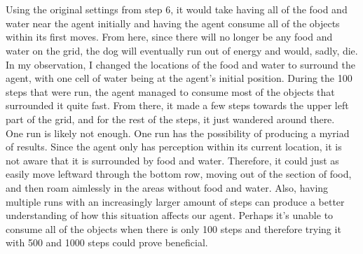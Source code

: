 \documentclass{article}
\begin{document}
    \section{}
        \begin{figure}[hbp]%
            \centering
            \hspace{1in}%
        \end{figure}
        Using the original settings from step 6, it would take having all of the food and water near the agent initially and having the agent consume all of the objects within its first moves. From here, since there will no longer be any food and water on the grid, the dog will eventually run out of energy and would, sadly, die.\\

        In my observation, I changed the locations of the food and water to surround the agent, with one cell of water being at the agent's initial position. During the 100 steps that were run, the agent managed to consume most of the objects that surrounded it quite fast. From there, it made a few steps towards the upper left part of the grid, and for the rest of the steps, it just wandered around there.\\

        One run is likely not enough. One run has the possibility of producing a myriad of results. Since the agent only has perception within its current location, it is not aware that it is surrounded by food and water. Therefore, it could just as easily move leftward through the bottom row, moving out of the section of food, and then roam aimlessly in the areas without food and water. Also, having multiple runs with an increasingly larger amount of steps can produce a better understanding of how this situation affects our agent. Perhaps it's unable to consume all of the objects when there is only 100 steps and therefore trying it with 500 and 1000 steps could prove beneficial. 
        
\end{document}
